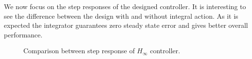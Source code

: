 We now focus on the step responses of the designed controller. It is interesting to see the difference between the design with and without integral action. As it is expected the integrator guarantees zero steady state error and gives better overall performance.

\begin{figure}[h]
	\centering
	\hfill
	\caption{Comparison between step response of $H_\infty$ controller.}
\end{figure}